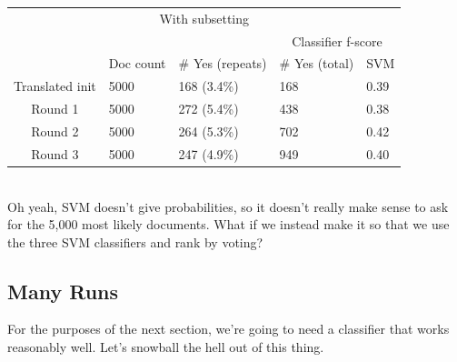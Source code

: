 \documentclass[11pt]{article} %
\begin{document}
\begin{tabular}{|c|l|l|l|l}
\multicolumn{5}{|c|}{With subsetting} \\
\rowcolor{gray!50} &&& \multicolumn{2}{|c|}{Classifier f-score} \\
\rowcolor{gray!50} & Doc count & \# Yes (repeats) & \# Yes (total) & SVM \\
Translated init & 5000 & 168 (3.4\%) & 168 & 0.39 \\
Round 1 & 5000 & 272 (5.4\%) & 438 & 0.38 \\
Round 2 & 5000 & 264 (5.3\%) & 702 & 0.42 \\
Round 3 & 5000 & 247 (4.9\%) & 949 & 0.40
\end{tabular} \\

Oh yeah, SVM doesn't give probabilities, so it doesn't really make sense to ask for the 5,000 most likely documents. What if we instead make it so that we use the three SVM classifiers and rank by voting?

\subsection{Many Runs}
For the purposes of the next section, we're going to need a classifier that works reasonably well. Let's snowball the hell out of this thing. \\
\end{document}

